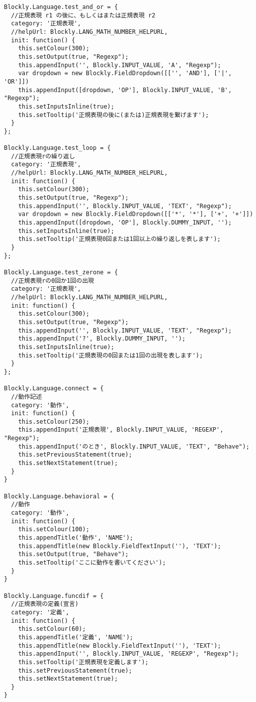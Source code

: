 \documentclass{risepaper}
\begin{document}
\begin{verbatim}
Blockly.Language.test_and_or = {
  //正規表現 r1 の後に、もしくはまたは正規表現 r2
  category: '正規表現',
  //helpUrl: Blockly.LANG_MATH_NUMBER_HELPURL,
  init: function() {
    this.setColour(300);
    this.setOutput(true, "Regexp");
    this.appendInput('', Blockly.INPUT_VALUE, 'A', "Regexp");
    var dropdown = new Blockly.FieldDropdown([['', 'AND'], ['|', 'OR']])
    this.appendInput([dropdown, 'OP'], Blockly.INPUT_VALUE, 'B', "Regexp");
    this.setInputsInline(true);
    this.setTooltip('正規表現の後に(または)正規表現を繋げます');
  }
};

Blockly.Language.test_loop = {
  //正規表現rの繰り返し
  category: '正規表現',
  //helpUrl: Blockly.LANG_MATH_NUMBER_HELPURL,
  init: function() {
    this.setColour(300);
    this.setOutput(true, "Regexp");
    this.appendInput('', Blockly.INPUT_VALUE, 'TEXT', "Regexp");
    var dropdown = new Blockly.FieldDropdown([['*', '*'], ['+', '+']])
    this.appendInput([dropdown, 'OP'], Blockly.DUMMY_INPUT, '');
    this.setInputsInline(true);
    this.setTooltip('正規表現0回または1回以上の繰り返しを表します');
  }
};

Blockly.Language.test_zerone = {
  //正規表現rの0回か1回の出現
  category: '正規表現',
  //helpUrl: Blockly.LANG_MATH_NUMBER_HELPURL,
  init: function() {
    this.setColour(300);
    this.setOutput(true, "Regexp");
    this.appendInput('', Blockly.INPUT_VALUE, 'TEXT', "Regexp");
    this.appendInput('?', Blockly.DUMMY_INPUT, '');
    this.setInputsInline(true);
    this.setTooltip('正規表現の0回または1回の出現を表します');
  }
};

Blockly.Language.connect = {
  //動作記述
  category: '動作',
  init: function() {
    this.setColour(250);
    this.appendInput('正規表現', Blockly.INPUT_VALUE, 'REGEXP', "Regexp");
    this.appendInput('のとき', Blockly.INPUT_VALUE, 'TEXT', "Behave");
    this.setPreviousStatement(true);
    this.setNextStatement(true);
  }
}

Blockly.Language.behavioral = {
  //動作
  category: '動作',
  init: function() {
    this.setColour(100);
    this.appendTitle('動作', 'NAME');
    this.appendTitle(new Blockly.FieldTextInput(''), 'TEXT');
    this.setOutput(true, "Behave");
    this.setTooltip('ここに動作を書いてください');
  }
}

Blockly.Language.funcdif = {
  //正規表現の定義(宣言)
  category: '定義',
  init: function() {
    this.setColour(60);
    this.appendTitle('定義', 'NAME');
    this.appendTitle(new Blockly.FieldTextInput(''), 'TEXT');
    this.appendInput('', Blockly.INPUT_VALUE, 'REGEXP', "Regexp");
    this.setTooltip('正規表現を定義します');
    this.setPreviousStatement(true);
    this.setNextStatement(true);
  }
}


\end{verbatim}
\end{document}

